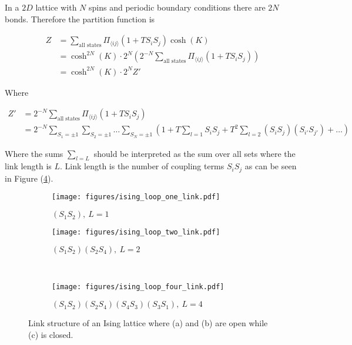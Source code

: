 In a $2D$ lattice with $N$ spins and periodic boundary conditions there are $2N$ bonds. Therefore the partition function is

\begin{align*}
    Z &= \sum_{\text{all states}} \Pi_{\langle ij \rangle} (1 + T S_i S_j) \cosh(K) \\
    &= \cosh^{2N} (K) \cdot 2^N \left ( 2^{-N} \sum_{\text{all states}} \Pi_{\langle ij \rangle} (1 + T S_i S_j) \right ) \\
    &= \cosh^{2N} (K) \cdot 2^N Z'
\end{align*}

Where

\begin{align*}
    Z' &= 2^{-N} \sum_{\text{all states}} \Pi_{\langle ij \rangle} (1 + T S_i S_j) \\
    &= 2^{-N} \sum_{S_1 = \pm 1} \sum_{S_2 = \pm 1} \ldots \sum_{S_N = \pm 1} \left ( 1 + T \sum_{l = 1} S_i S_j + T^2 \sum_{l = 2} (S_i S_j)(S_{i'} S_{j'}) + \ldots \right ) 
\end{align*}

Where the sums $\sum_{l=L}$ should be interpreted as the sum over all sets where the link length is $L$. Link length is the number of coupling terms $S_i S_j$ as can be seen in Figure (\ref{fig:LinkIsing}).

\begin{figure}[h!]
    \begin{subfigure}{.5\linewidth}
        \centering
        \texttt{[image: figures/ising\_loop\_one\_link.pdf]}
        \caption{$(S_1 S_2), \ L = 1$}
        \label{fig:oneLinkIsing}
    \end{subfigure}%
    \begin{subfigure}{.5\linewidth}
        \centering
        \texttt{[image: figures/ising\_loop\_two\_link.pdf]}
        \caption{$(S_1 S_2)(S_2 S_4), \ L = 2$}
        \label{fig:twoLinkIsing}
    \end{subfigure}\\[1ex]
    \begin{subfigure}{\linewidth}
        \centering
        \texttt{[image: figures/ising\_loop\_four\_link.pdf]}
        \caption{$(S_1 S_2)(S_2 S_4)(S_4 S_3)(S_3 S_1), \ L = 4$}
    \label{fig:fourLinkIsing}
    \end{subfigure}
    \caption{Link structure of an Ising lattice where (a) and (b) are open while (c) is closed.}
    \label{fig:LinkIsing}
\end{figure}

